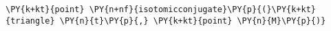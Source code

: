 \begin{Verbatim}[commandchars=\\\{\}]
    \PY{k+kt}{point} \PY{n+nf}{isotomicconjugate}\PY{p}{(}\PY{k+kt}{triangle} \PY{n}{t}\PY{p}{,} \PY{k+kt}{point} \PY{n}{M}\PY{p}{)}
\end{Verbatim}
